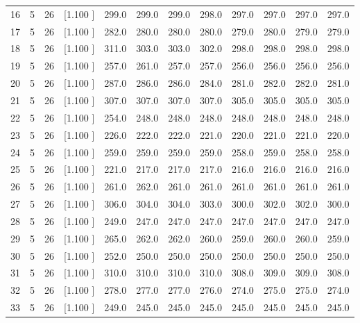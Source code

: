 \documentclass[12pt,a4paper]{article}
\begin{document}
\begin{center}
{\begin{tabular}{r r r r r r r r r r r r}
  16&  5& 26&[1.100     ]&   299.0&   299.0&   299.0&   298.0&   297.0&   297.0&   297.0&   297.0\\[-0.02in]
  17&  5& 26&[1.100     ]&   282.0&   280.0&   280.0&   280.0&   279.0&   280.0&   279.0&   279.0\\[-0.02in]
  18&  5& 26&[1.100     ]&   311.0&   303.0&   303.0&   302.0&   298.0&   298.0&   298.0&   298.0\\[-0.02in]
  19&  5& 26&[1.100     ]&   257.0&   261.0&   257.0&   257.0&   256.0&   256.0&   256.0&   256.0\\[-0.02in]
  20&  5& 26&[1.100     ]&   287.0&   286.0&   286.0&   284.0&   281.0&   282.0&   282.0&   281.0\\[-0.02in]
  21&  5& 26&[1.100     ]&   307.0&   307.0&   307.0&   307.0&   305.0&   305.0&   305.0&   305.0\\[-0.02in]
  22&  5& 26&[1.100     ]&   254.0&   248.0&   248.0&   248.0&   248.0&   248.0&   248.0&   248.0\\[-0.02in]
  23&  5& 26&[1.100     ]&   226.0&   222.0&   222.0&   221.0&   220.0&   221.0&   221.0&   220.0\\[-0.02in]
  24&  5& 26&[1.100     ]&   259.0&   259.0&   259.0&   259.0&   258.0&   259.0&   258.0&   258.0\\[-0.02in]
  25&  5& 26&[1.100     ]&   221.0&   217.0&   217.0&   217.0&   216.0&   216.0&   216.0&   216.0\\[-0.02in]
  26&  5& 26&[1.100     ]&   261.0&   262.0&   261.0&   261.0&   261.0&   261.0&   261.0&   261.0\\[-0.02in]
  27&  5& 26&[1.100     ]&   306.0&   304.0&   304.0&   303.0&   300.0&   302.0&   302.0&   300.0\\[-0.02in]
  28&  5& 26&[1.100     ]&   249.0&   247.0&   247.0&   247.0&   247.0&   247.0&   247.0&   247.0\\[-0.02in]
  29&  5& 26&[1.100     ]&   265.0&   262.0&   262.0&   260.0&   259.0&   260.0&   260.0&   259.0\\[-0.02in]
  30&  5& 26&[1.100     ]&   252.0&   250.0&   250.0&   250.0&   250.0&   250.0&   250.0&   250.0\\[-0.02in]
  31&  5& 26&[1.100     ]&   310.0&   310.0&   310.0&   310.0&   308.0&   309.0&   309.0&   308.0\\[-0.02in]
  32&  5& 26&[1.100     ]&   278.0&   277.0&   277.0&   276.0&   274.0&   275.0&   275.0&   274.0\\[-0.02in]
  33&  5& 26&[1.100     ]&   249.0&   245.0&   245.0&   245.0&   245.0&   245.0&   245.0&   245.0\\[-0.02in]

\end{tabular}}
\end{center}
\end{document}
